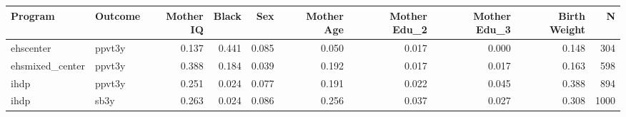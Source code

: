 \begin{table}[ht]
\centering
\begin{tabular}{llrrrrrrrr}
  \hline
Program & Outcome & Mother IQ & Black & Sex & Mother Age & Mother Edu\_2 & Mother Edu\_3 & Birth Weight & N \\ 
  \hline
ehscenter & ppvt3y & 0.137 & 0.441 & 0.085 & 0.050 & 0.017 & 0.000 & 0.148 & 304 \\ 
  ehsmixed\_center & ppvt3y & 0.388 & 0.184 & 0.039 & 0.192 & 0.017 & 0.017 & 0.163 & 598 \\ 
  ihdp & ppvt3y & 0.251 & 0.024 & 0.077 & 0.191 & 0.022 & 0.045 & 0.388 & 894 \\ 
  ihdp & sb3y & 0.263 & 0.024 & 0.086 & 0.256 & 0.037 & 0.027 & 0.308 & 1000 \\ 
   \hline
\end{tabular}
\end{table}
